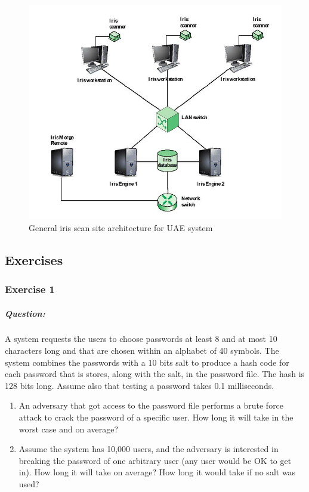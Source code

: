 \documentclass{article}
\begin{document}
        \begin{figure}[h]
            \begin{center}
                \includegraphics[scale=0.5]{../immagini/general.png}
            \end{center}
            \caption{General iris
            scan site
            architecture for
            UAE system}
        \end{figure}
        \newpage
    \subsection{Exercises}
        \subsubsection{Exercise 1}
            \subparagraph{Question: }A system requests the users to choose passwords at least 8 and at most 10 characters long and that are
            chosen within an alphabet of 40 symbols. The system combines the passwords with a 10 bits salt to
            produce a hash code for each password that is stores, along with the salt, in the password file. The hash
            is 128 bits long.
            Assume also that testing a password takes 0.1 milliseconds.
            \begin{enumerate}
                \item  An adversary that got access to the password file performs a brute force attack to crack the
                password of a specific user. How long it will take in the worst case and on average?
                \item  Assume the system has 10,000 users, and the adversary is interested in breaking the password of
                one arbitrary user (any user would be OK to get in). How long it will take on average?
                How long it would take if no salt was used?
            \end{enumerate}
\end{document}
